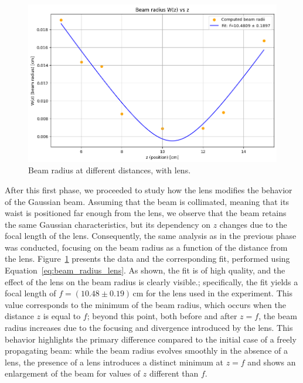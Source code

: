 \documentclass[prl,twocolumn]{revtex4-1}
\begin{document}
\begin{figure}[!b]
    \centering
    \includegraphics[width=\linewidth]{Images/beam_radius_lens_fit.png}
    \caption{Beam radius at different distances, with lens.}
    \label{fig:beam_radius_lens_fit}
\end{figure}

After this first phase, we proceeded to study how the lens modifies the behavior of the Gaussian beam. Assuming that the beam is collimated, meaning that its waist is positioned far enough from the lens, we observe that the beam retains the same Gaussian characteristics, but its dependency on $z$ changes due to the focal length of the lens. Consequently, the same analysis as in the previous phase was conducted, focusing on the beam radius as a function of the distance from the lens.
Figure~\ref{fig:beam_radius_lens_fit} presents the data and the corresponding fit, performed using Equation~\eqref{eq:beam_radius_lens}. As shown, the fit is of high quality, and the effect of the lens on the beam radius is clearly visible.; specifically, the fit yields a focal length of $f = (10.48 \pm 0.19) \, \text{cm}$ for the lens used in the experiment. This value corresponds to the minimum of the beam radius, which occurs when the distance $z$ is equal to $f$; beyond this point, both before and after $z = f$, the beam radius increases due to the focusing and divergence introduced by the lens. This behavior highlights the primary difference compared to the initial case of a freely propagating beam: while the beam radius evolves smoothly in the absence of a lens, the presence of a lens introduces a distinct minimum at $z = f$ and shows an enlargement of the beam for values of $z$ different than $f$.
\end{document}

